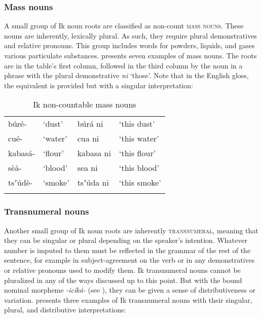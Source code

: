 \subsubsection{Mass nouns}\label{sec:4.2.5}

A small group of Ik noun roots are classified as non-count \textsc{mass} \textsc{nouns}. These nouns are inherently, lexically plural. As such, they require plural demonstratives and relative pronouns. This group includes words for powders, liquids, and gases various particulate substances.  presents seven examples of mass nouns. The roots are in the table's first column, followed in the third column by the noun in a phrase with the plural demonstrative \textit{ni} ‘those’. Note that in the English gloss, the equivalent is provided but with a singular interpretation:


\begin{table}
\caption{Ik non-countable mass nouns}
\label{tab:nouns:mass}
\begin{tabularx}{\textwidth}{XXXX}
\lsptoprule
búré- & ‘dust’ & búrá ni & ‘this dust’\\
cué- & ‘water’ & cua ni & ‘this water’\\
kabasá- & ‘flour’ & kabasa ni & ‘this flour’\\
sèà- & ‘blood’ & sea ni & ‘this blood’\\
tsʼúdè- & ‘smoke’ & tsʼúda ni & ‘this smoke’\\
\lspbottomrule
\end{tabularx}
\end{table}

\subsubsection{Transnumeral nouns}\label{sec:4.2.6}

Another small group of Ik noun roots are inherently \textsc{transnumeral}, meaning that they can be singular or plural depending on the speaker's intention. Whatever number is imputed to them must be reflected in the grammar of the rest of the sentence, for example in subject-agreement on the verb or in any demonstratives or relative pronouns used to modify them. Ik transnumeral nouns cannot be pluralized in any of the ways discussed up to this point. But with the bound nominal morpheme \textit{{}-icíká-} (see ), they can be given a sense of distributiveness or variation.  presents three examples of Ik transnumeral nouns with their singular, plural, and distributive interpretations:



